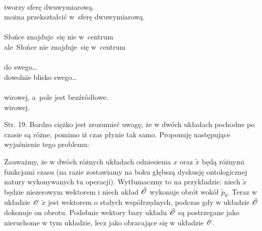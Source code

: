 \documentclass[a4paper,11pt]{article}
\numberwithin{equation}{section}
\begin{document}
\noindent
{} \\
\Jest  tworzy sferę dwuwymiarową. \\
\Powin można przekształcić w~sferę dwuwymiarową. \\
 \\
\Jest  Słońce znajduje~się nie w~centrum \\
\Powin ale~Słońce nie znajduje~się w~centrum \\
 \\
\Jest  do swego\ldots \\
\Powin dowolnie blisko swego\ldots \\
 \\
\Jest  wirowej, a~pole jest bezźródłowe. \\
\Powin wirowej. \\













\newpage


\vspace{0em}



\vspace{0em}



\vspace{\spaceFour}



\noindent
Str. 19. Bardzo ciężko jest zrozumieć uwagę, że w dwóch układach pochodne po czasie są różne, pomimo iż czas płynie tak samo. Proponuję następujące wyjaśnienie tego problemu:

Zauważmy, że w dwóch różnych układach odniesienia $x$ oraz
$\tilde{ x }$ będą różnymi funkcjami czasu (na razie zostawiamy na
boku głębszą dyskusję ontologicznej natury wykonywanych tu operacji).
Wytłumaczmy to na przykładzie: niech $\tilde{ x }$ będzie niezerowym
wektorem i niech układ $\tilde{ \mathcal{O} }$ wykonuje obrót wokół
$\tilde{ p }_{ 0 }$. Teraz w układzie $\mathcal{O}$ $\tilde{ x }$
jest wektorem o stałych współrzędnych, podczas gdy w układzie
$\tilde{ \mathcal{O} }$ dokonuje on obrotu. Podobnie wektory bazy
układu $\tilde{ \mathcal{O} }$ są postrzegane jako nieruchome w tym
układzie, lecz jako obracające się w
układzie $\mathcal{O}$.
\end{document}
